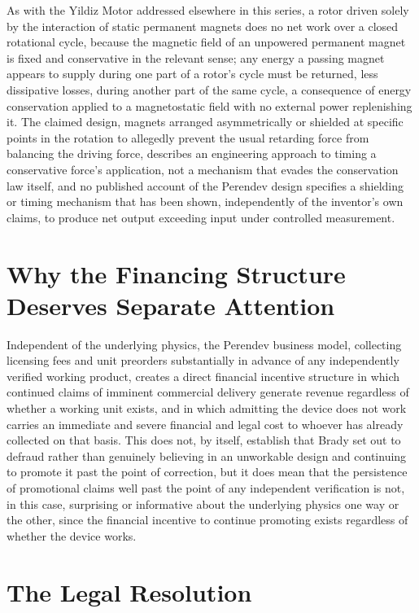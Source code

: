 \documentclass[11pt]{article}
\begin{document}
As with the Yildiz Motor addressed elsewhere in this series, a rotor driven solely by the interaction of static permanent magnets does no net work over a closed rotational cycle, because the magnetic field of an unpowered permanent magnet is fixed and conservative in the relevant sense; any energy a passing magnet appears to supply during one part of a rotor's cycle must be returned, less dissipative losses, during another part of the same cycle, a consequence of energy conservation applied to a magnetostatic field with no external power replenishing it. The claimed design, magnets arranged asymmetrically or shielded at specific points in the rotation to allegedly prevent the usual retarding force from balancing the driving force, describes an engineering approach to timing a conservative force's application, not a mechanism that evades the conservation law itself, and no published account of the Perendev design specifies a shielding or timing mechanism that has been shown, independently of the inventor's own claims, to produce net output exceeding input under controlled measurement.

\section{Why the Financing Structure Deserves Separate Attention}

Independent of the underlying physics, the Perendev business model, collecting licensing fees and unit preorders substantially in advance of any independently verified working product, creates a direct financial incentive structure in which continued claims of imminent commercial delivery generate revenue regardless of whether a working unit exists, and in which admitting the device does not work carries an immediate and severe financial and legal cost to whoever has already collected on that basis. This does not, by itself, establish that Brady set out to defraud rather than genuinely believing in an unworkable design and continuing to promote it past the point of correction, but it does mean that the persistence of promotional claims well past the point of any independent verification is not, in this case, surprising or informative about the underlying physics one way or the other, since the financial incentive to continue promoting exists regardless of whether the device works.

\section{The Legal Resolution}
\end{document}
